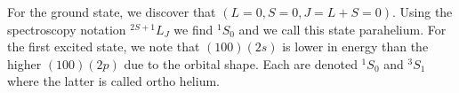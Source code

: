 \vspace{2ex}
\begin{rmk}
For the ground state, we discover that $(L=0,S=0,J=L+S=0)$. Using the spectroscopy notation ${}^{2S+1}L_{J}$ we find ${}^{1}S_{0}$ and we call this state parahelium. For the first excited state, we note that $(100)(2s)$ is lower in energy than the higher $(100)(2p)$ due to the orbital shape. Each are denoted ${}^{1}S_{0}$ and ${}^{3}S_{1}$ where the latter is called ortho helium.
\end{rmk}
\vspace{2ex}

